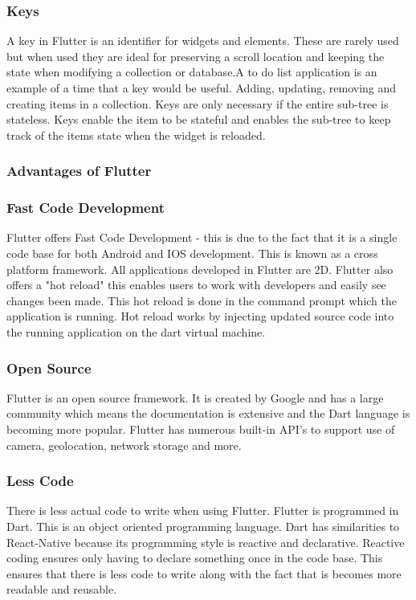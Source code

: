 \subsubsection{Keys}
A key in Flutter is an identifier for widgets and elements. These are rarely used but when used they are ideal for preserving a scroll location and keeping the state when modifying a collection or database.\cite{key_widgets}A to do list application is an example of a time that a key would be useful. Adding, updating, removing and creating items in a collection. Keys are only necessary if the entire sub-tree is stateless. Keys enable the item to be stateful and enables the sub-tree to keep track of the items state when the widget is reloaded. \cite{keys}

\subsubsection{Advantages of Flutter}

\subsubsection{Fast Code Development}
Flutter offers Fast Code Development - this is due to the fact that it is a single code base for both Android and IOS development. This is known as a cross platform framework. All applications developed in Flutter are 2D. Flutter also offers a "hot reload" this enables users to work with developers and easily see changes been made. This hot reload is done in the command prompt which the application is running. Hot reload works by injecting updated source code into the running application on the dart virtual machine.\cite{faq_2019}
\subsubsection{Open Source}
Flutter is an open source framework. It is created by Google and has a large community which means the documentation is extensive and the Dart language is becoming more popular. Flutter has numerous built-in API's to support use of camera, geolocation, network storage and more.\cite{pros_cons}
\subsubsection{Less Code}
There is less actual code to write when using Flutter. Flutter is programmed in Dart. This is an object oriented programming language. Dart has similarities to React-Native because its programming style is reactive and declarative.\cite{pros_cons} Reactive coding ensures only having to declare something once in the code base. This ensures that there is less code to write along with the fact that is becomes more readable and reusable.\cite{depth_flutter_2019}
